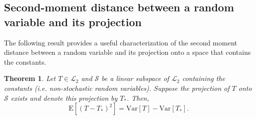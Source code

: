 \documentclass[12pt]{article}
\numberwithin{equation}{section}
\theoremstyle{definition}
\theoremstyle{plain}
\newtheorem{theorem}{Theorem}[section]
\begin{document}
\subsection{Second-moment distance between a random variable and its projection}

The following result provides a useful characterization of the second
moment distance between a random variable and its projection onto a space that
contains the constants.

\begin{theorem}
\label{thm--proj-L2-dist-as-dif-of-vars}
Let \(T \in \mathscr{L}_{2}\) and \(\mathcal{S}\) be a
linear subspace of \(\mathscr{L}_{2}\) containing the constants
(i.e. non-stochastic random variables).
Suppose the projection of \(T\) onto \(\mathcal{S}\) exists and denote this
projection by \(T_{\ast}\).
Then,
\begin{equation}
  \mathrm{E} \left[ \left( T - T_{\ast} \right)^{2} \right] =
  \mathrm{Var} [T] - \mathrm{Var} \left[ T_{\ast} \right].
  \label{eqn--proj-L2-dist-as-dif-of-vars}
\end{equation}
\end{theorem}
\end{document}
